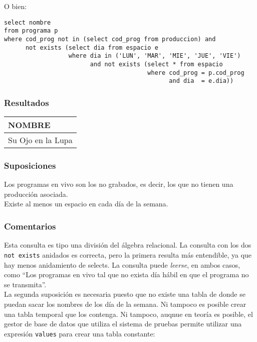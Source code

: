 O bien:

\begin{lstlisting} 
select nombre 
from programa p
where cod_prog not in (select cod_prog from produccion) and
      not exists (select dia from espacio e
                  where dia in ('LUN', 'MAR', 'MIE', 'JUE', 'VIE') 
                        and not exists (select * from espacio 
                                        where cod_prog = p.cod_prog 
                                              and dia  = e.dia))
\end{lstlisting} 

\subsubsection*{Resultados}
\begin{tabular}{|l|}
  \hline
    \bf{NOMBRE} \\ 
  \hline
    Su Ojo en la Lupa \\ 
  \hline
\end{tabular} 

\subsubsection*{Suposiciones}
Los programas en vivo son los no grabados, es decir, los que no tienen una producción asociada. \\

Existe al menos un espacio en cada día de la semana. \\

\subsubsection*{Comentarios}
Esta consulta es tipo una división del álgebra relacional. La consulta con los dos \lstinline|not exists| anidados es correcta, pero la primera resulta más entendible, ya que hay menos anidamiento de selects. La consulta puede \textit{leerse}, en ambos casos, como ``Los programas en vivo tal que no exista día hábil en que el programa no se transmita''. \\

La segunda suposición es necesaria puesto que no existe una tabla de donde se puedan sacar los nombres de los día de la semana. Ni tampoco es posible crear una tabla temporal que los contenga. Ni tampoco, auqnue en teoría es posible\cite{values_expression}, el gestor de base de datos que utiliza el sistema de pruebas permite utilizar una expresión \lstinline|values| para crear una tabla constante:

